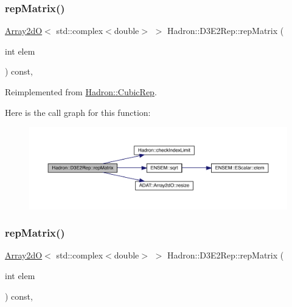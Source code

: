 \subsubsection{\texorpdfstring{repMatrix()}{repMatrix()}\hspace{0.1cm}{\footnotesize\ttfamily [1/3]}}
{\footnotesize\ttfamily \mbox{\hyperlink{classADAT_1_1Array2dO}{Array2dO}}$<$ std\+::complex$<$double$>$ $>$ Hadron\+::\+D3\+E2\+Rep\+::rep\+Matrix (\begin{DoxyParamCaption}\item[{int}]{elem }\end{DoxyParamCaption}) const\hspace{0.3cm}{\ttfamily [inline]}, {\ttfamily [virtual]}}



Reimplemented from \mbox{\hyperlink{structHadron_1_1CubicRep_ac5d7e9e6f4ab1158b5fce3e4ad9e8005}{Hadron\+::\+Cubic\+Rep}}.

Here is the call graph for this function\+:
\nopagebreak
\begin{figure}[H]
\begin{center}
\leavevmode
\includegraphics[width=350pt]{db/de8/structHadron_1_1D3E2Rep_a941daa264ff6a6495a1bb521abe9021b_cgraph}
\end{center}
\end{figure}
\mbox{\label{structHadron_1_1D3E2Rep_a941daa264ff6a6495a1bb521abe9021b}} 
\subsubsection{\texorpdfstring{repMatrix()}{repMatrix()}\hspace{0.1cm}{\footnotesize\ttfamily [2/3]}}
{\footnotesize\ttfamily \mbox{\hyperlink{classADAT_1_1Array2dO}{Array2dO}}$<$ std\+::complex$<$double$>$ $>$ Hadron\+::\+D3\+E2\+Rep\+::rep\+Matrix (\begin{DoxyParamCaption}\item[{int}]{elem }\end{DoxyParamCaption}) const\hspace{0.3cm}{\ttfamily [inline]}, {\ttfamily [virtual]}}



